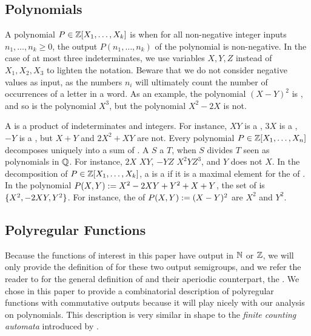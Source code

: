 \subsection{Polynomials} \AP A polynomial $P \in \mathbb{Z}[X_1, \dots, X_k]$ is
 when for all non-negative integer inputs $n_1, \dots, n_k
\geq 0$, the output  $P(n_1, \dots, n_k)$ of the polynomial is non-negative. In
the case of at most three indeterminates, we use variables $X,Y,Z$ instead of
$X_1, X_2, X_3$ to lighten the notation. Beware that we do not consider
negative values as input, as the numbers $n_i$ will ultimately count the number
of occurrences of a letter in a word. As an example, the polynomial $(X - Y)^2$
is , and so is the polynomial $X^3$, but the polynomial $X^2 -
2X$ is not.

\AP A  is a product of indeterminates and integers. For
instance, $XY$ is a , $3 X$ is a , $-Y$ is a
, but $X + Y$ and $2X^2 + XY$ are not. Every polynomial $P \in
\mathbb{Z}[X_1, \dots, X_n]$ decomposes uniquely into a sum of . A
 $S$  a  $T$, when $S$ divides $T$
seen as polynomials in $\mathbb{Q}$. For instance, $2X$  $XY$, $-YZ$
 $X^2 Y Z^3$, and $Y$ does not  $X$. In the
decomposition of $P \in \mathbb{Z}[X_1, \dots, X_k]$, a  is a
 if it is a maximal element for the  of . In the polynomial $P(X,Y) \mathrel{:=} X^2 - 2XY +
Y^2 + X + Y$, the set of  is $\mathopen{\{} X^2,  -2 XY,
Y^2 \mathclose{\}}$. For instance, the   of $P(X,Y) \mathrel{:=}
(X - Y)^2$ are $X^2$ and $Y^2$.

\subsection{Polyregular Functions}
\label{polyregular:sec}

\AP Because the functions of interest in this paper have output in $\mathbb{N}$ or
$\mathbb{Z}$, we will only provide the definition of 
for these two output semigroups, and we refer the reader to \cite{BOKL19} for
the general definition of  and their aperiodic
counterpart, the . We chose in this
paper to provide a combinatorial description of polyregular functions with
commutative outputs because it will play nicely with our analysis on
polynomials. This description is very similar in shape to the \emph{finite
counting automata} introduced by \cite{SCHU62}. 

